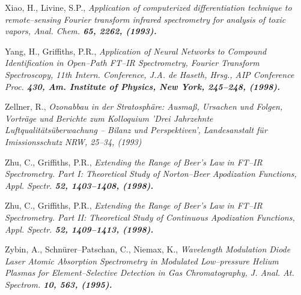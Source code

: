 \begin{thebibliography}{giese-bogdan,199797}
 Xiao, H., Livine, S.P., \it Application of computerized differentiation
technique to remote--sensing Fourier transform infrared
spectrometry for analysis of toxic vapors\rm , Anal. Chem. \bf
65\rm , 2262, (1993).

 Yang, H., Griffiths, P.R.,
\it Application of Neural Networks to Compound Identification in
Open--Path FT--IR Spectrometry\rm , Fourier Transform
Spectroscopy, 11th Intern. Conference, J.A. de Haseth, Hrsg., AIP
Conference Proc. \bf 430\rm , Am. Institute of Physics, New York,
245--248, (1998).

 Zellner, R., \it Ozonabbau in
der Stratosph\"{a}re: Ausma{\ss}, Ursachen und Folgen\rm , Vortr\"{a}ge und
Berichte zum Kolloquium 'Drei Jahrzehnte Luftqualit\"{a}ts\"{u}berwachung
-- Bilanz und Perspektiven', Landesanstalt f\"{u}r Imissionsschutz
NRW, 25--34, (1993)

 Zhu, C., Griffiths, P.R., \it Extending the Range
of Beer's Law in FT--IR Spectrometry. Part I: Theoretical Study of
Norton--Beer Apodization Functions\rm , Appl. Spectr. \bf 52\rm ,
1403--1408, (1998).

 Zhu, C., Griffiths, P.R., \it Extending the Range
of Beer's Law in FT--IR Spectrometry. Part II: Theoretical Study
of Continuous Apodization Functions\rm , Appl. Spectr. \bf 52\rm ,
1409--1413, (1998).

Zybin, A., Schn\"{u}rer--Patschan, C.,
Niemax, K., \it Wavelength Modulation Diode Laser Atomic
Absorption Spectrometry in Modulated Low--pressure Helium Plasmas
for Element--Selective Detection in Gas Chromatography\rm , J.
Anal. At. Spectrom. \bf 10\rm, 563, (1995).

\end{thebibliography}

\cleardoublepage
